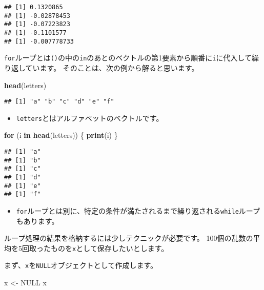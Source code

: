 \documentclass[]{bxjsarticle}
\newenvironment{Shaded}{\begin{snugshade}}{\end{snugshade}}
\newcommand{\ControlFlowTok}[1]{\textcolor[rgb]{0.13,0.29,0.53}{\textbf{#1}}}
\newcommand{\KeywordTok}[1]{\textcolor[rgb]{0.13,0.29,0.53}{\textbf{#1}}}
\newcommand{\NormalTok}[1]{#1}
\newcommand{\OtherTok}[1]{\textcolor[rgb]{0.56,0.35,0.01}{#1}}
\newcommand{\StringTok}[1]{\textcolor[rgb]{0.31,0.60,0.02}{#1}}
\providecommand{\tightlist}{%
  \setlength{\itemsep}{0pt}\setlength{\parskip}{0pt}}
\begin{document}
\begin{verbatim}
## [1] 0.1320865
## [1] -0.02878453
## [1] -0.07223823
## [1] -0.1101577
## [1] -0.007778733
\end{verbatim}

\texttt{for}ループとは\texttt{()}の中の\texttt{in}のあとのベクトルの第1要素から順番に\texttt{i}に代入して繰り返しています。
そのことは、次の例から解ると思います。

\begin{Shaded}
\begin{Highlighting}[]
\KeywordTok{head}\NormalTok{(letters)}
\end{Highlighting}
\end{Shaded}

\begin{verbatim}
## [1] "a" "b" "c" "d" "e" "f"
\end{verbatim}

\begin{itemize}
\tightlist
\item
  \texttt{letters}とはアルファベットのベクトルです。
\end{itemize}

\begin{Shaded}
\begin{Highlighting}[]
\ControlFlowTok{for}\NormalTok{ (i }\ControlFlowTok{in} \KeywordTok{head}\NormalTok{(letters)) \{}
  \KeywordTok{print}\NormalTok{(i)}
\NormalTok{\}}
\end{Highlighting}
\end{Shaded}

\begin{verbatim}
## [1] "a"
## [1] "b"
## [1] "c"
## [1] "d"
## [1] "e"
## [1] "f"
\end{verbatim}

\begin{itemize}
\tightlist
\item
  \texttt{for}ループとは別に、特定の条件が満たされるまで繰り返される\texttt{while}ループもあります。
\end{itemize}

ループ処理の結果を格納するには少しテクニックが必要です。
100個の乱数の平均を5回取ったものを\texttt{x}として保存したいとします。

まず、\texttt{x}を\texttt{NULL}オブジェクトとして作成します。

\begin{Shaded}
\begin{Highlighting}[]
\NormalTok{x <-}\StringTok{ }\OtherTok{NULL}
\NormalTok{x}
\end{Highlighting}
\end{Shaded}
\end{document}
